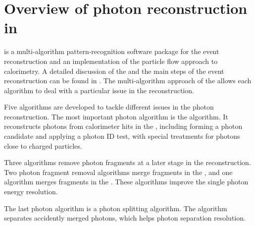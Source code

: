 
\section{Overview of photon reconstruction in \pandora}

\pandora is a multi-algorithm pattern-recognition software package for the event reconstruction and an implementation of the particle flow approach to calorimetry. A detailed discussion of the \pandora and the main steps of the \pandora event reconstruction can be found in . The multi-algorithm approach of the \pandora allows each algorithm to deal with a particular issue in the reconstruction.


Five algorithms are developed to tackle different issues in the photon reconstruction. The most important photon algorithm is the \PhotonReconstruction algorithm. It reconstructs photons from calorimeter hits in the \ECAL, including forming a photon candidate and applying a photon ID test, with special treatments for photons close to charged particles. %


Three algorithms remove photon fragments at a later stage in the reconstruction. Two photon fragment removal algorithms merge fragments in the \ECAL, and one algorithm merges fragments in the \HCAL. These algorithms improve the single photon energy resolution.

The last photon algorithm is a photon splitting algorithm. The algorithm separates accidently merged photons, which helps photon separation resolution.


